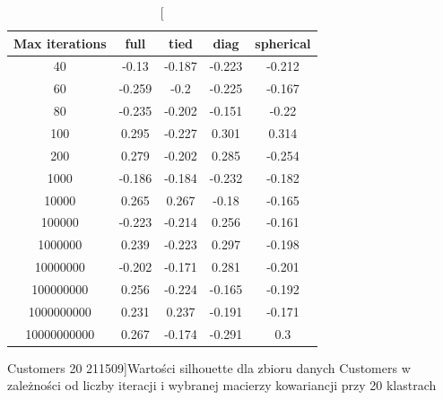 \documentclass{classrep}
\begin{document}
{{\begin{table}[!htbp]
                \begin{minipage}{1\textwidth}
                \centering
                \begin{tabular}{|c|c|c|c|c|}
                \hline
                Max iterations & full & tied & diag & spherical \\ \hline
                40 & -0.13 & -0.187 & -0.223 & -0.212 \\ \hline
                60 & -0.259 & -0.2 & -0.225 & -0.167 \\ \hline
                80 & -0.235 & -0.202 & -0.151 & -0.22 \\ \hline
                100 & 0.295 & -0.227 & 0.301 & 0.314 \\ \hline
                200 & 0.279 & -0.202 & 0.285 & -0.254 \\ \hline
                1000 & -0.186 & -0.184 & -0.232 & -0.182 \\ \hline
                10000 & 0.265 & 0.267 & -0.18 & -0.165 \\ \hline
                100000 & -0.223 & -0.214 & 0.256 & -0.161 \\ \hline
                1000000 & 0.239 & -0.223 & 0.297 & -0.198 \\ \hline
                10000000 & -0.202 & -0.171 & 0.281 & -0.201 \\ \hline
                100000000 & 0.256 & -0.224 & -0.165 & -0.192 \\ \hline
                1000000000 & 0.231 & 0.237 & -0.191 & -0.171 \\ \hline
                10000000000 & 0.267 & -0.174 & -0.291 & 0.3 \\ \hline
                \end{tabular}
                \caption
                [Customers 20 211509]{Wartości silhouette dla zbioru danych Customers w zależności od liczby iteracji i wybranej macierzy kowariancji przy 20 klastrach}
                \label{Customers_20_211509}
                \end{minipage}
                \hfill
            \end{table}
            
}}
\end{document}
